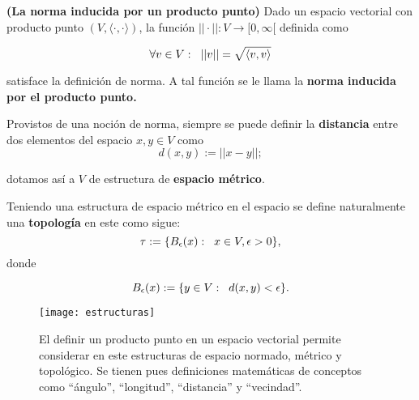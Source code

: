 \begin{prop}
\label{prop: La norma inducida por un producto punto}
\textbf{(La norma inducida por un producto punto)}
Dado un espacio vectorial con
producto punto $(V, \langle \cdot , \cdot \rangle )$, 
la función $|| \cdot || : V \longrightarrow [0, \infty[$ definida como

\begin{equation}
\label{eq: norma via producto punto}
\forall v \in V: \hspace{0.2cm} || v || = \sqrt{\langle v,v \rangle}
\end{equation}

\noindent
satisface la definición de norma. A tal función se le llama
la \textbf{norma inducida por el producto punto.}
\end{prop}

Provistos de una noción de norma, siempre se puede definir
la \textbf{distancia} entre dos elementos del espacio
$x, y \in V$ como 
\begin{equation}
\label{eq: distancia a partir de norma}
d(x, y) := ||x-y||;
\end{equation}

\noindent
dotamos así a $V$ de estructura de \textbf{espacio métrico}.

Teniendo una estructura de espacio métrico en el espacio se 
define naturalmente una \textbf{topología} en este como sigue:
\begin{equation}
\label{eq: top espacio con producto punto}
\tau := \{ B_{\epsilon}(x) : \hspace{0.2cm} x \in V, \epsilon >0 \},
\end{equation}
donde 

\[
B_{\epsilon}(x) := \{ y \in V : \hspace{0.2cm} d(x,y) < \epsilon \}.
\]


\begin{figure}[H]
\centering\captionsetup{format = hang}
	\begin{measuredfigure}
		\texttt{[image: estructuras]} 
		\caption{El definir un producto punto en un espacio
		vectorial permite considerar en este estructuras de espacio normado,
		métrico y topológico. Se tienen pues definiciones
		matemáticas de conceptos como ``ángulo'', ``longitud'',
		``distancia'' y ``vecindad''.}
 	\end{measuredfigure}
 \end{figure}


